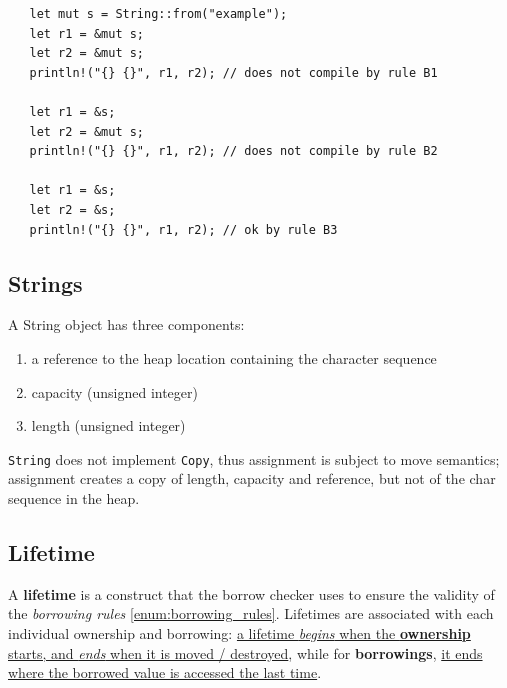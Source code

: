 \begin{lstlisting}
   let mut s = String::from("example");
   let r1 = &mut s;
   let r2 = &mut s;
   println!("{} {}", r1, r2); // does not compile by rule B1

   let r1 = &s;
   let r2 = &mut s;
   println!("{} {}", r1, r2); // does not compile by rule B2
   
   let r1 = &s;
   let r2 = &s;
   println!("{} {}", r1, r2); // ok by rule B3
\end{lstlisting}

\subsection{Strings}

A String object has three components:
\begin{enumerate}
   \item a reference to the heap location containing the character sequence
   \item capacity (unsigned integer)
   \item length (unsigned integer)
\end{enumerate}
\lstinline|String| does not implement \lstinline|Copy|, thus assignment is subject to move semantics;
assignment creates a copy of length, capacity and reference,
but not of the char sequence in the heap.

\subsection{Lifetime}
A \textbf{lifetime} is a construct that the borrow checker uses to ensure the validity of the \textit{borrowing rules} \ref{enum:borrowing_rules}.
Lifetimes are associated with each individual ownership
and borrowing: 
\ul{a lifetime \textit{begins} when the \textbf{ownership} starts, and \textit{ends}
when it is moved / destroyed}, 
while for \textbf{borrowings}, \ul{it ends where the borrowed value is
accessed the last time}.

